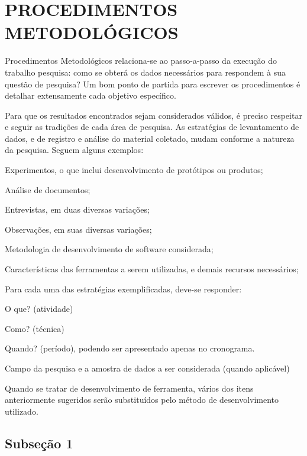 \section{PROCEDIMENTOS METODOLÓGICOS}

Procedimentos Metodológicos relaciona-se ao passo-a-passo da execução do trabalho pesquisa: como se obterá os dados necessários para respondem à sua questão de pesquisa? Um bom ponto de partida para escrever os procedimentos é detalhar extensamente cada objetivo específico.

Para que os resultados encontrados sejam considerados válidos, é preciso respeitar e seguir as tradições de cada área de pesquisa. As estratégias de levantamento de dados, e de registro e análise do material coletado, mudam conforme a natureza da pesquisa. Seguem alguns exemplos:


\begin{alineascomponto}
    \item Experimentos, o que inclui desenvolvimento de protótipos ou produtos;
    \item Análise de documentos;
    \item Entrevistas, em duas diversas variações;
    \item Observações, em suas diversas variações;
    \item Metodologia de desenvolvimento de software considerada;
    \item Características das ferramentas a serem utilizadas, e demais recursos necessários;
    \item Para cada uma das estratégias exemplificadas, deve-se responder: 
    \item O que? (atividade)
    \item Como? (técnica)
    \item Quando? (período), podendo ser apresentado apenas no cronograma.
    \item Campo da pesquisa e a amostra de dados a ser considerada (quando aplicável)

\end{alineascomponto}

Quando se tratar de desenvolvimento de ferramenta, vários dos itens anteriormente sugeridos serão substituídos pelo método de desenvolvimento utilizado.

\subsection{Subseção 1}

